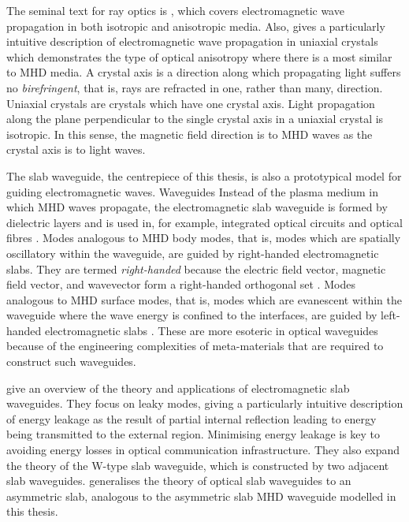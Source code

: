 \documentclass[12pt]{../style-files/ociamthesis}
\begin{document}
	The seminal text for ray optics is \cite{bor_etal99}, which covers electromagnetic wave propagation in both isotropic and anisotropic media. Also, \cite{vei_etal10} gives a particularly intuitive description of electromagnetic wave propagation in uniaxial crystals which demonstrates the type of optical anisotropy where there is a most similar to MHD media. A crystal axis is a direction along which propagating light suffers no \textit{birefringent}, that is, rays are refracted in one, rather than many, direction. Uniaxial crystals are crystals which have one crystal axis. Light propagation along the plane perpendicular to the single crystal axis in a uniaxial crystal is isotropic. In this sense, the magnetic field direction is to MHD waves as the crystal axis is to light waves. 
	
	The slab waveguide, the centrepiece of this thesis, is also a prototypical model for guiding electromagnetic waves. Waveguides  Instead of the plasma medium in which MHD waves propagate, the electromagnetic slab waveguide is formed by dielectric layers and is used in, for example, integrated optical circuits and optical fibres \citep{ram_etal84}. Modes analogous to MHD body modes, that is, modes which are spatially oscillatory within the waveguide, are guided by right-handed electromagnetic slabs. They are termed \textit{right-handed} because the electric field vector, magnetic field vector, and wavevector form a right-handed orthogonal set \citep{ram_etal84}. Modes analogous to MHD surface modes, that is, modes which are evanescent within the waveguide where the wave energy is confined to the interfaces, are guided by left-handed electromagnetic slabs  \cite{wan_etal08,ash13,sha_etal03}. These are more esoteric in optical waveguides because of the engineering complexities of meta-materials that are required to construct such waveguides.
	
	\cite{Hu_etal09} give an overview of the theory and applications of electromagnetic slab waveguides. They focus on leaky modes, giving a particularly intuitive description of energy leakage as the result of partial internal reflection leading to energy being transmitted to the external region. Minimising energy leakage is key to avoiding energy losses in optical communication infrastructure. They also expand the theory of the W-type slab waveguide, which is constructed by two adjacent slab waveguides. \cite{mar74} generalises the theory of optical slab waveguides to an asymmetric slab, analogous to the asymmetric slab MHD waveguide modelled in this thesis.
	
\end{document}
